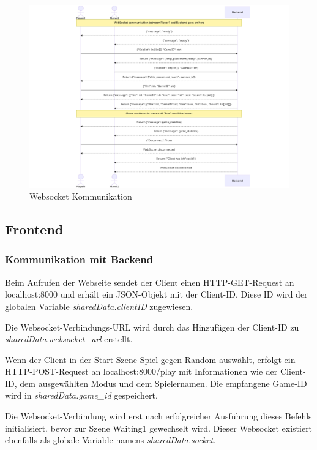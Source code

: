 \documentclass[a4paper, 10pt, conference]{IEEEtran}
\begin{document}
\begin{figure}[thp]
    \centering
    \includegraphics[width=\linewidth]{websocket_comm}
    \caption{Websocket Kommunikation}
    \label{fig:websocket_comm}
\end{figure}

\subsection{Frontend}\label{subsec:frontend}

\subsubsection{Kommunikation mit Backend}\label{subsec:comwithbackend}

Beim Aufrufen der Webseite sendet der Client einen HTTP-GET-Request an \glqq localhost:8000\grqq{} und erhält ein JSON-Objekt mit der Client-ID. Diese ID wird der globalen Variable \textit{sharedData.clientID} zugewiesen.

Die Websocket-Verbindungs-URL wird durch das Hinzufügen der Client-ID zu \textit{sharedData.websocket\_url} erstellt.

Wenn der Client in der Start-Szene \glqq Spiel gegen Random\grqq{} auswählt, erfolgt ein HTTP-POST-Request an \glqq localhost:8000/play\grqq{} mit Informationen wie der Client-ID, dem ausgewählten Modus und dem Spielernamen. Die empfangene Game-ID wird in \textit{sharedData.game\_id} gespeichert.

Die Websocket-Verbindung wird erst nach erfolgreicher Ausführung dieses Befehls initialisiert, bevor zur Szene \glqq Waiting1\grqq{} gewechselt wird. Dieser Websocket existiert ebenfalls als globale Variable namens \textit{sharedData.socket}.
\end{document}
